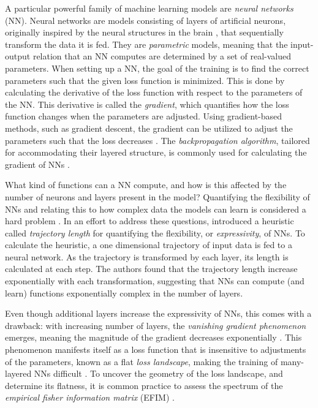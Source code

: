 A particular powerful family of machine learning models are \emph{neural networks} (NN). Neural networks are models consisting of layers of artificial neurons, originally inspired by the neural structures in the brain \cite{hands-on}, that sequentially transform the data it is fed. They are \emph{parametric} models, meaning that the input-output relation that an NN computes are determined by a set of real-valued parameters. When setting up a NN, the goal of the training is to find the correct parameters such that the given loss function is minimized. This is done by calculating the derivative of the loss function with respect to the parameters of the NN. This derivative is called the \emph{gradient}, which quantifies how the loss function changes when the parameters are adjusted. Using gradient-based methods, such as gradient descent, the gradient can be utilized to adjust the parameters such that the loss decreases \cite{hands-on}. The \emph{backpropagation algorithm}, tailored for accommodating their layered structure, is commonly used for calculating the gradient of NNs \cite{hands-on}. 

What kind of functions can a NN compute, and how is this affected by the number of neurons and layers present in the model? Quantifying the flexibility of NNs and relating this to how complex data the models can learn is considered a hard problem \cite{raghu2017expressive}. In an effort to address these questions, \citet{raghu2017expressive} introduced a heuristic called \emph{trajectory length} for quantifying the flexibility, or \emph{expressivity}, of NNs. To calculate the heuristic, a one dimensional trajectory of input data is fed to a neural network. As the trajectory is transformed by each layer, its length is calculated at each step. The authors found that the trajectory length increase exponentially with each transformation, suggesting that NNs can compute (and learn) functions exponentially complex in the number of layers.  

Even though additional layers increase the expressivity of NNs, this comes with a drawback: with increasing number of layers, the \emph{vanishing gradient phenomenon} emerges, meaning the magnitude of the gradient decreases exponentially \cite{LeCun2012}. This phenomenon manifests itself as a loss function that is insensitive to adjustments of the parameters, known as a flat \emph{loss landscape}, making the training of many-layered NNs difficult \cite{karakida2019universal}. To uncover the geometry of the loss landscape, and determine its flatness, it is common practice to assess the spectrum of the \emph{empirical fisher information matrix} (EFIM) \cite{karakida2019universal}.


